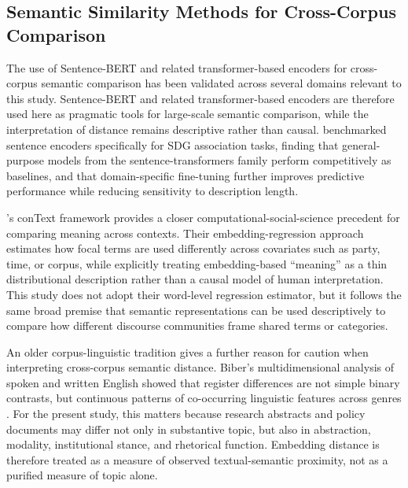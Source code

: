\documentclass[12pt,a4paper]{article}
\begin{document}
\subsection{Semantic Similarity Methods for Cross-Corpus Comparison}

The use of Sentence-BERT \parencite{Reimers2019} and related transformer-based encoders for cross-corpus semantic comparison has been validated across several domains relevant to this study. Sentence-BERT and related transformer-based encoders are therefore used here as pragmatic tools for large-scale semantic comparison, while the interpretation of distance remains descriptive rather than causal. \textcite{Gjorgjevikj2025} benchmarked sentence encoders specifically for SDG association tasks, finding that general-purpose models from the sentence-transformers family perform competitively as baselines, and that domain-specific fine-tuning further improves predictive performance while reducing sensitivity to description length.

\textcite{Rodriguez2023}'s conText framework provides a closer computational-social-science precedent for comparing meaning across contexts. Their embedding-regression approach estimates how focal terms are used differently across covariates such as party, time, or corpus, while explicitly treating embedding-based ``meaning'' as a thin distributional description rather than a causal model of human interpretation. This study does not adopt their word-level regression estimator, but it follows the same broad premise that semantic representations can be used descriptively to compare how different discourse communities frame shared terms or categories.

An older corpus-linguistic tradition gives a further reason for caution when interpreting cross-corpus semantic distance. Biber's multidimensional analysis of spoken and written English showed that register differences are not simple binary contrasts, but continuous patterns of co-occurring linguistic features across genres \parencite{biber1988variation}. For the present study, this matters because research abstracts and policy documents may differ not only in substantive topic, but also in abstraction, modality, institutional stance, and rhetorical function. Embedding distance is therefore treated as a measure of observed textual-semantic proximity, not as a purified measure of topic alone.
\end{document}

